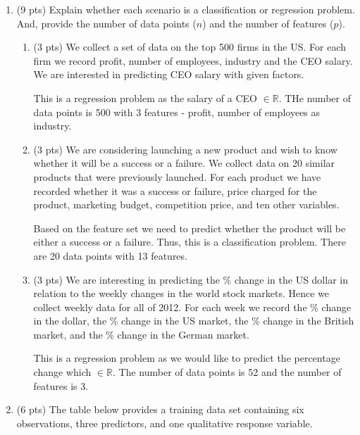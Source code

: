 \documentclass[a4paper]{article}
\theoremstyle{definition}
\newcommand{\rr}{\mathbb{R}}
\newenvironment{soln}{
    \leavevmode\color{blue}\ignorespaces
}{}
\begin{document}
\begin{enumerate}
\item (9 pts) Explain whether each scenario is a classification or regression problem. And, provide the number of data points ($n$) and the number of features ($p$).

\begin{enumerate}
	\item (3 pts) We collect a set of data on the top 500 firms in the US. For each firm we record profit, number of employees, industry and the CEO salary. We are interested in predicting CEO salary with given factors.
	
	\begin{soln}  This is a regression problem as the salary of a CEO $\in \rr$. THe number of data points is 500 with 3 features - profit, number of employees as industry. \end{soln}
	
	\item (3 pts) We are considering launching a new product and wish to know whether it will be a success or a failure. We collect data on 20 similar products that were previously launched. For each product we have recorded whether it was a success or failure, price charged for the product, marketing budget, competition price, and ten other variables.
	
	\begin{soln}  Based on the feature set we need to predict whether the product will be either a success or a failure. Thus, this is a classification problem. There are 20 data points with 13 features.\end{soln}
	
	\item (3 pts) We are interesting in predicting the \% change in the US dollar in relation to the weekly changes in the world stock markets. Hence we collect weekly data for all of 2012. For each week we record the \% change in the dollar, the \% change in the US market, the \% change in the British market, and the \% change in the German market.
	
	\begin{soln} This is a regression problem as we would like to predict the percentage change which $\in \rr$. The number of data points is 52 and the number of features is 3. \end{soln}
	
\end{enumerate}

\item (6 pts) The table below provides a training data set containing six observations, three predictors, and one qualitative response variable.


\end{enumerate}
\end{document}
